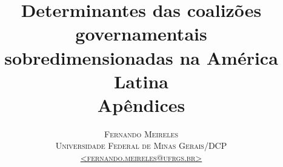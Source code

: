 \documentclass[article, 12pt,oneside,a4paper,spanish,english,brazilian, sumario=abnt-6027-2012]{abntex2}
\title{\Large Determinantes das coalizões governamentais\\[-0.2cm] sobredimensionadas na América Latina \\ \vspace*{3cm} \Large Apêndices \vspace*{1.5cm}}
\author{\normalsize\scshape Fernando Meireles\\[-0.35cm] \footnotesize Universidade Federal de Minas Gerais/DCP\\[-0.35cm] \footnotesize \href{mailto:fernando.meireles@ufrgs.br}{<fernando.meireles@ufrgs.br>}}
\date{}
\begin{document}
\frenchspacing
\maketitle

\textual

\newpage

\postextual

\end{document}
